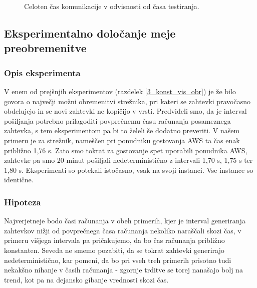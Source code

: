 \begin{figure}[H]
    \caption{Celoten čas komunikacije v odvisnosti od časa testiranja.}
    \label{fig:3_rezultati6_T1T3}
\end{figure}



\subsection{Eksperimentalno določanje meje preobremenitve}

\subsubsection{Opis eksperimenta}

V enem od prejšnjih eksperimentov (razdelek \ref{3_konst_vis_obr}) je že bilo govora o največji možni obremenitvi strežnika, pri kateri se zahtevki pravočasno obdelujejo in se novi zahtevki ne kopičijo v vrsti.
Predvideli smo, da je interval pošiljanja potrebno prilagoditi povprečnemu času računanja posameznega zahtevka, s tem eksperimentom pa bi to želeli še dodatno preveriti.
V našem primeru je za strežnik, nameščen pri ponudniku gostovanja AWS ta čas enak približno 1,76 s.
Zato smo tokrat za gostovanje spet uporabili ponudnika AWS, zahtevke pa smo 20 minut pošiljali nedeterministično z intervali 1,70 s, 1,75 s ter 1,80 s.  Eksperimenti so potekali istočasno, vsak na svoji instanci. Vse instance so identične.

\subsubsection{Hipoteza}

Najverjetneje bodo časi računanja v obeh primerih, kjer je interval generiranja zahtevkov nižji od povprečnega časa računanja nekoliko naraščali skozi čas, v primeru višjega intervala pa pričakujemo, da bo čas računanja približno konstanten.
Seveda ne smemo pozabiti, da se tokrat zahtevki generirajo nedeterministično, kar pomeni, da bo pri vseh treh primerih prisotno tudi nekakšno nihanje v časih računanja - zgornje trditve se torej nanašajo bolj na trend, kot pa na dejansko gibanje vrednosti skozi čas.


